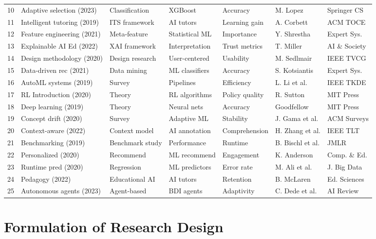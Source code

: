 \documentclass[12pt,a4paper,oneside,openany]{report}
\begin{document}
\begin{spacing}{1.0}
\begin{longtable}{@{}lp{3cm}p{2cm}p{2cm}p{1.5cm}p{2cm}l@{}}
10 & Adaptive selection (2023) & Classification & XGBoost & Accuracy & M. Lopez & Springer CS \\
11 & Intelligent tutoring (2019) & ITS framework & AI tutors & Learning gain & A. Corbett & ACM TOCE \\
12 & Feature engineering (2021) & Meta-feature & Statistical ML & Importance & Y. Shrestha & Expert Sys. \\
13 & Explainable AI Ed (2022) & XAI framework & Interpretation & Trust metrics & T. Miller & AI \& Society \\
14 & Design methodology (2020) & Design research & User-centered & Usability & M. Sedlmair & IEEE TVCG \\
15 & Data-driven rec (2021) & Data mining & ML classifiers & Accuracy & S. Kotsiantis & Expert Sys. \\
16 & AutoML systems (2019) & Survey & Pipelines & Efficiency & L. Li et al. & IEEE TKDE \\
17 & RL Introduction (2020) & Theory & RL algorithms & Policy quality & R. Sutton & MIT Press \\
18 & Deep learning (2019) & Theory & Neural nets & Accuracy & Goodfellow & MIT Press \\
19 & Concept drift (2020) & Survey & Adaptive ML & Stability & J. Gama et al. & ACM Surveys \\
20 & Context-aware (2022) & Context model & AI annotation & Comprehension & H. Zhang et al. & IEEE TLT \\
21 & Benchmarking (2019) & Benchmark study & Performance & Runtime & B. Bischl et al. & JMLR \\
22 & Personalized (2020) & Recommend & ML recommend & Engagement & K. Anderson & Comp. \& Ed. \\
23 & Runtime pred (2020) & Regression & ML predictors & Error rate & M. Ali et al. & J. Big Data \\
24 & Pedagogy (2022) & Educational AI & AI tutors & Retention & B. McLaren & Ed. Sciences \\
25 & Autonomous agents (2023) & Agent-based & BDI agents & Adaptivity & C. Dede et al. & AI Review \\
\bottomrule
\end{longtable}
\end{spacing}








\pagestyle{plain}
\chapter{Formulation of Research Design}
\end{document}
